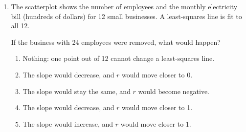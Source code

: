 \documentclass[12pt]{article}
\begin{document}
\begin{enumerate}[leftmargin=1.9em, itemsep=0.13in]
  \boxguard[20]
  \item The scatterplot shows the number of employees and the monthly electricity bill
        (hundreds of dollars) for 12 small businesses. A least-squares line is fit to all 12.

        \vspace{3pt}
        {\centering
        \par}
        \vspace{1pt}

        If the business with 24 employees were removed, what would happen?\hfill{}\rule[-0.2in]{0pt}{0.48in}
        \begin{enumerate}[label=\textbf{(\Alph*)}, leftmargin=2.2em, itemsep=2pt]
          \item Nothing: one point out of 12 cannot change a least-squares line.
          \item The slope would decrease, and $r$ would move closer to 0.
          \item The slope would stay the same, and $r$ would become negative.
          \item The slope would decrease, and $r$ would move closer to 1.
          \item The slope would increase, and $r$ would move closer to 1.
        \end{enumerate}


\end{enumerate}
\end{document}
